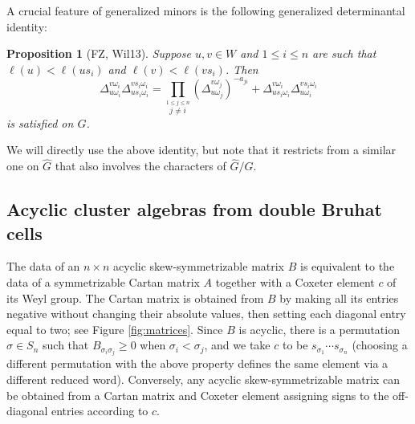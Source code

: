 \documentclass[12pt]{amsart}
\newtheorem{proposition}[theorem]{Proposition}
\theoremstyle{remark}
\numberwithin{equation}{section}
\begin{document}
A crucial feature of generalized minors is the following generalized determinantal identity:

\begin{proposition}[FZ, Wil13]
  \label{prop:fundid}
  Suppose $u,v \in W$ and $1 \leq i \leq n$ are such that $\ell(u)<\ell(us_i)$ and $\ell(v)<\ell(vs_i)$. 
  Then 
  \begin{equation}
    \label{eq:fundid}
    \Delta_{u\omega_i}^{v\omega_i} \Delta_{us_i\omega_i}^{vs_i\omega_i} 
    =
    \prod_{\stackrel{1\leq j \leq n}{j\neq i}}\left(\Delta_{u\omega_j}^{v\omega_j}\right)^{-a_{ji}}
    +
    \Delta_{us_i\omega_i}^{v\omega_i} \Delta_{u\omega_i}^{vs_i\omega_i}
  \end{equation}
is satisfied on $G$.
\end{proposition}

We will directly use the above identity, but note that it restricts from a similar one on $\widehat{G}$ that also involves the characters of $\widehat{G}/G$.

\subsection{Acyclic cluster algebras from double Bruhat cells}

The data of an $n\times n$ acyclic skew-symmetrizable matrix $B$ is equivalent to the data of a symmetrizable Cartan matrix $A$ together with a Coxeter element $c$ of its Weyl group.
The Cartan matrix is obtained from $B$ by making all its entries negative without changing their absolute values, then setting each diagonal entry equal to two; see Figure \ref{fig:matrices}.
Since $B$ is acyclic, there is a permutation $\sigma \in S_n$ such that $B_{\sigma_i \sigma_j} \geq 0$ when $\sigma_i < \sigma_j$, and we take $c$ to be $s_{\sigma_1} \cdots s_{\sigma_n}$ (choosing a different permutation with the above property defines the same element via a different reduced word).
Conversely, any acyclic skew-symmetrizable matrix can be obtained from a Cartan matrix and Coxeter element assigning signs to the off-diagonal entries according to $c$.
\end{document}
